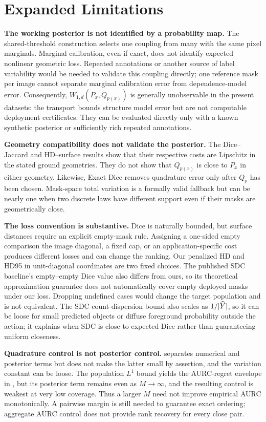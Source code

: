 \section{Expanded Limitations}
\label{app:limitations}

\noindent\textbf{The working posterior is not identified by a probability map.}
The shared-threshold construction selects one coupling from many with the same pixel
marginals. Marginal calibration, even if exact, does not identify expected nonlinear
geometric loss. Repeated annotations or another source of label variability would be
needed to validate this coupling directly; one reference mask per image cannot
separate marginal calibration error from dependence-model error. Consequently,
\(W_{1,d}(P_x,Q_{p(x)})\) is generally unobservable in the present datasets:
the transport bounds structure model error but are not computable deployment
certificates. They can be evaluated directly only with a known synthetic
posterior or sufficiently rich repeated annotations.

\noindent\textbf{Geometry compatibility does not validate the posterior.}
The Dice--Jaccard and HD--surface results show that their respective costs are
Lipschitz in the stated ground geometries. They do not show that
\(Q_{p(x)}\) is close to \(P_x\) in either geometry. Likewise, Exact Dice
removes quadrature error only after \(Q_p\) has been chosen. Mask-space total
variation is a formally valid fallback but can be nearly one when two discrete
laws have different support even if their masks are geometrically close.

\noindent\textbf{The loss convention is substantive.}
Dice is naturally bounded, but surface distances require an explicit empty-mask
rule. Assigning a one-sided empty comparison the image diagonal, a fixed cap, or an
application-specific cost produces different losses and can change the ranking. Our
penalized HD and HD95 in unit-diagonal coordinates are two fixed choices. The published SDC baseline's
empty--empty Dice value also differs from ours, so its theoretical approximation
guarantee does not automatically cover empty deployed masks under our loss.
Dropping undefined cases would change the target population and is not equivalent.
The SDC count-dispersion bound also scales as \(1/|\widehat{Y}|\), so it can be loose
for small predicted objects or diffuse foreground probability outside the
action; it explains when SDC is close to expected Dice rather than guaranteeing
uniform closeness.

\noindent\textbf{Quadrature control is not posterior control.}
 separates numerical and posterior terms but does not make
the latter small by assertion, and the variation constant can be loose. The
population \(L^1\) bound yields the AURC-regret envelope in
, but its posterior term remains even as
\(M\to\infty\), and the resulting control is weakest at very low coverage. Thus a
larger \(M\) need not improve empirical AURC monotonically. A pairwise margin is
still needed to guarantee exact ordering; aggregate AURC control does not provide
rank recovery for every close pair.


